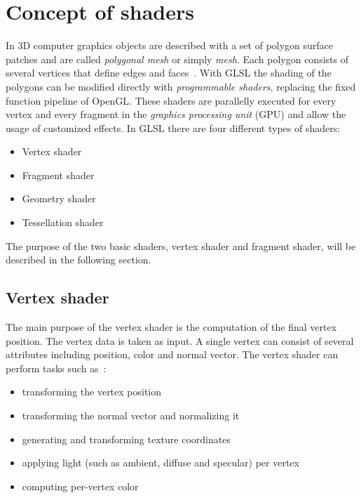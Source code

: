 \section{Concept of shaders}
In 3D computer graphics objects are described with a set of polygon surface patches and are called \emph{polygonal mesh} or simply \emph{mesh}. Each polygon consists of several vertices that define edges and faces~\cite{book:computerGraphicsHearn}. With GLSL the shading of the polygons can be modified directly with \emph{programmable shaders}, replacing the fixed function pipeline of OpenGL. These shaders are parallelly executed for every vertex and every fragment in the \emph{graphics processing unit} (GPU) and allow the usage of customized effects. In GLSL there are four different types of shaders:
\begin{itemize}
	\item Vertex shader
	\item Fragment shader
	\item Geometry shader
	\item Tessellation shader
\end{itemize}

The purpose of the two basic shaders, vertex shader and fragment shader, will be described in the following section.

\subsection{Vertex shader}
The main purpose of the vertex shader is the computation of the final vertex position. The vertex data is taken as input. A single vertex can consist of several attributes including position, color and normal vector. The vertex shader can perform tasks such as~\cite{book:computerGraphicsHill}: %
\begin{itemize}
	\item transforming the vertex position
	\item transforming the normal vector and normalizing it
	\item generating and transforming texture coordinates
	\item applying light (such as ambient, diffuse and specular) per vertex
	\item computing per-vertex color
\end{itemize}

